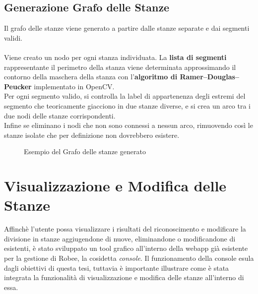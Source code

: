 \subsection{Generazione Grafo delle Stanze}
Il grafo delle stanze viene generato a partire dalle stanze separate e dai segmenti validi.\\\\
Viene creato un nodo per ogni stanza individuata. La \textbf{lista di segmenti} rappresentante il perimetro della stanza viene determinata approssimando il contorno della maschera della stanza con l'\textbf{algoritmo di Ramer–Douglas–Peucker} implementato in OpenCV.\\
Per ogni segmento valido, si controlla la label di appartenenza degli estremi del segmento che teoricamente giacciono in due stanze diverse, e si crea un arco tra i due nodi delle stanze corrispondenti. \\
Infine se eliminano i nodi che non sono connessi a nessun arco, rimuovendo così le stanze isolate che per definizione non dovrebbero esistere.
\begin{figure}[H]
  \centering
  \caption{Esempio del Grafo delle stanze generato}
\end{figure}
\section{Visualizzazione e Modifica delle Stanze}
Affinchè l'utente possa visualizzare i risultati del riconoscimento e modificare la divisione in stanze aggiugendone di nuove, eliminandone o modificandone di esistenti, è stato sviluppato un tool grafico all'interno della webapp già esistente per la gestione di Robee, la cosidetta \textit{console}. Il funzionamento della console esula dagli obiettivi di questa tesi, tuttavia è importante illustrare come è stata integrata la funzionalità di visualizzazione e modifica delle stanze all'interno di essa.
